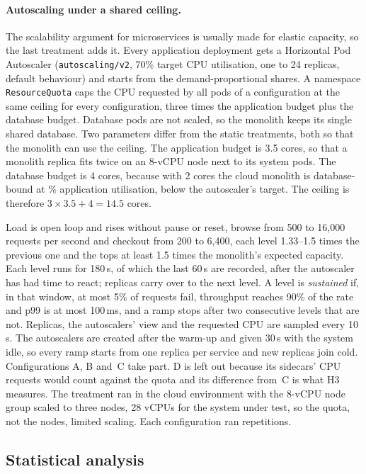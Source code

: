 \paragraph{Autoscaling under a shared ceiling.} The scalability argument for microservices is usually made for
elastic capacity, so the last treatment adds it. Every application deployment gets a Horizontal Pod Autoscaler
(\texttt{autoscaling/v2}, 70\% target CPU utilisation, one to 24 replicas, default behaviour) and starts from the
demand-proportional shares. A namespace \texttt{ResourceQuota} caps the CPU requested by all pods of a configuration
at the same ceiling for every configuration, three times the application budget plus the database budget. Database
pods are not scaled, so the monolith keeps its single shared database. Two parameters differ from the static
treatments, both so that the monolith can use the ceiling. The application budget is 3.5 cores, so that a monolith
replica fits twice on an 8-vCPU node next to its system pods. The database budget is 4 cores, because with 2 cores the cloud monolith is database-bound at \% application
utilisation, below the autoscaler's target. The ceiling is therefore $3 \times 3.5 + 4 = 14.5$ cores. 

Load is open loop and rises without pause or reset, browse from 500 to 16{,}000 requests per second and checkout
from 200 to 6{,}400, each level 1.33--1.5 times the previous one and the tops at least 1.5 times the monolith's
expected capacity. Each level runs for 180\,s, of which the last 60\,s are recorded, after the autoscaler has had
time to react; replicas carry over to the next level. A level is \emph{sustained} if, in that window, at most 5\%
of requests fail, throughput reaches 90\% of the rate and p99 is at most 100\,ms, and a ramp stops after two
consecutive levels that are not. Replicas, the autoscalers' view and the requested CPU are sampled every 10\,s. The
autoscalers are created after the warm-up and given 30\,s with the system idle, so every ramp starts from one
replica per service and new replicas join cold. Configurations A, B and~C take part. D is left out because its
sidecars' CPU requests would count against the quota and its difference from~C is what H3 measures. The treatment
ran in the cloud environment with the 8-vCPU node group scaled to three nodes, 28 vCPUs for the system under test,
so the quota, not the nodes, limited scaling. Each configuration ran  repetitions.

\subsection{Statistical analysis}
\label{sec:stats}

